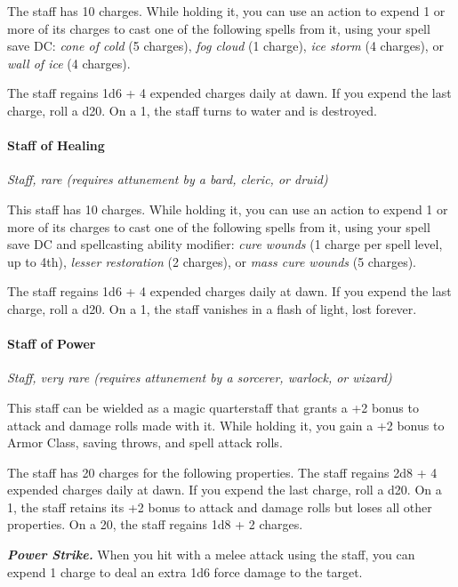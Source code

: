 \documentclass[
]{article}
\begin{document}
The staff has 10 charges. While holding it, you can use an action to
expend 1 or more of its charges to cast one of the following spells from
it, using your spell save DC: \emph{cone of cold} (5 charges), \emph{fog
cloud} (1 charge), \emph{ice storm} (4 charges), or \emph{wall of ice}
(4 charges).

The staff regains 1d6 + 4 expended charges daily at dawn. If you expend
the last charge, roll a d20. On a 1, the staff turns to water and is
destroyed.

\hypertarget{staff-of-healing}{%
\paragraph{Staff of Healing}\label{staff-of-healing}}

\emph{Staff, rare (requires attunement by a bard, cleric, or druid)}

This staff has 10 charges. While holding it, you can use an action to
expend 1 or more of its charges to cast one of the following spells from
it, using your spell save DC and spellcasting ability modifier:
\emph{cure wounds} (1 charge per spell level, up to 4th), \emph{lesser
restoration} (2 charges), or \emph{mass cure wounds} (5 charges).

The staff regains 1d6 + 4 expended charges daily at dawn. If you expend
the last charge, roll a d20. On a 1, the staff vanishes in a flash of
light, lost forever.

\hypertarget{staff-of-power}{%
\paragraph{Staff of Power}\label{staff-of-power}}

\emph{Staff, very rare (requires attunement by a sorcerer, warlock, or
wizard)}

This staff can be wielded as a magic quarterstaff that grants a +2 bonus
to attack and damage rolls made with it. While holding it, you gain a +2
bonus to Armor Class, saving throws, and spell attack rolls.

The staff has 20 charges for the following properties. The staff regains
2d8 + 4 expended charges daily at dawn. If you expend the last charge,
roll a d20. On a 1, the staff retains its +2 bonus to attack and damage
rolls but loses all other properties. On a 20, the staff regains 1d8 + 2
charges.

\emph{\textbf{Power Strike.}} When you hit with a melee attack using the
staff, you can expend 1 charge to deal an extra 1d6 force damage to the
target.
\end{document}
